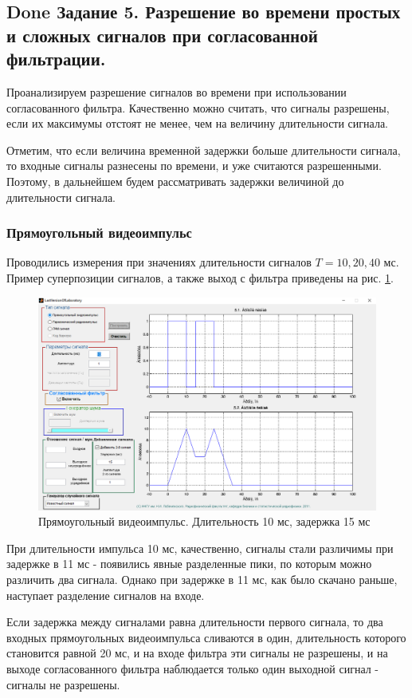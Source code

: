 \subsection{Done Задание 5. Разрешение во времени простых и сложных сигналов при
согласованной фильтрации.}

Проанализируем разрешение сигналов во времени при использовании согласованного фильтра.
Качественно можно считать, что сигналы разрешены, если их максимумы
отстоят не менее, чем на величину длительности сигнала.

Отметим, что если величина временной задержки больше длительности сигнала, то входные сигналы разнесены по времени, 
и уже считаются разрешенными. Поэтому, в дальнейшем будем рассматривать задержки величиной
до длительности сигнала.

\subsubsection{Прямоугольный видеоимпульс}
Проводились измерения при значениях длительности сигналов $T = 10, 20, 40$ мс. Пример суперпозиции сигналов, а также
выход с фильтра приведены на рис. \ref{fig:task5_1_10_15}.
\begin{figure}[H]
    \centering
    \includegraphics[width=0.7\linewidth]{imgs/task5/t5s1_dur10_del15.png}
    \caption{Прямоугольный видеоимпульс. Длительность 10 мс, задержка 15 мс}
    \label{fig:task5_1_10_15}
\end{figure}
При длительности импульса 10 мс, качественно, сигналы стали различимы при задержке в 11 мс - появились явные разделенные
пики, по которым можно различить два сигнала. Однако при задержке в 11 мс, как было скачано раньше, наступает разделение
сигналов на входе. 

Если задержка между сигналами равна длительности первого сигнала, то два входных прямоугольных видеоимпульса
сливаются в один, длительность которого становится равной 20 мс, и на входе фильтра эти сигналы не разрешены, и на
выходе согласованного фильтра наблюдается только один выходной сигнал - сигналы не разрешены.

